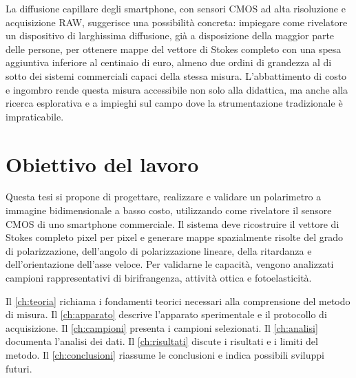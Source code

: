 La diffusione capillare degli smartphone, con sensori CMOS ad alta risoluzione e acquisizione RAW, suggerisce una possibilità concreta: impiegare come rivelatore un dispositivo di larghissima diffusione, già a disposizione della maggior parte delle persone, per ottenere mappe del vettore di Stokes completo con una spesa aggiuntiva inferiore al centinaio di euro, almeno due ordini di grandezza al di sotto dei sistemi commerciali capaci della stessa misura. L'abbattimento di costo e ingombro rende questa misura accessibile non solo alla didattica, ma anche alla ricerca esplorativa e a impieghi sul campo dove la strumentazione tradizionale è impraticabile.


\section{Obiettivo del lavoro}
\label{sec:obiettivo}

Questa tesi si propone di progettare, realizzare e validare un polarimetro a immagine bidimensionale a basso costo, utilizzando come rivelatore il sensore CMOS di uno smartphone commerciale. Il sistema deve ricostruire il vettore di Stokes completo pixel per pixel e generare mappe spazialmente risolte del grado di polarizzazione, dell'angolo di polarizzazione lineare, della ritardanza e dell'orientazione dell'asse veloce. Per validarne le capacità, vengono analizzati campioni rappresentativi di birifrangenza, attività ottica e fotoelasticità.

Il \cref{ch:teoria} richiama i fondamenti teorici necessari alla comprensione del metodo di misura. Il \cref{ch:apparato} descrive l'apparato sperimentale e il protocollo di acquisizione. Il \cref{ch:campioni} presenta i campioni selezionati. Il \cref{ch:analisi} documenta l'analisi dei dati. Il \cref{ch:risultati} discute i risultati e i limiti del metodo. Il \cref{ch:conclusioni} riassume le conclusioni e indica possibili sviluppi futuri. %
